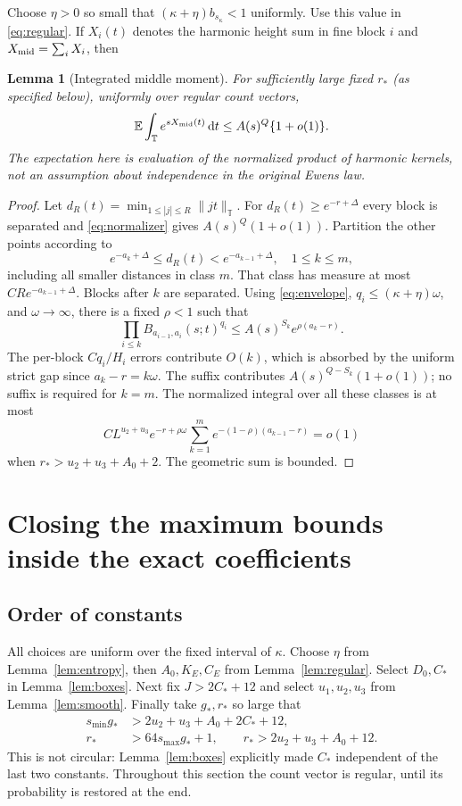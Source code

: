 \documentclass[11pt]{article}
\newtheorem{lemma}[theorem]{Lemma}
\theoremstyle{definition}\newtheorem{definition}[theorem]{Definition}
\theoremstyle{remark}\newtheorem{remark}[theorem]{Remark}
\newcommand{\E}{\mathbb E}\newcommand{\Pp}{\mathbb P}
\newcommand{\T}{\mathbb T}\newcommand{\R}{\mathbb R}\newcommand{\C}{\mathbb C}
\newcommand{\dd}{\,\mathrm d}\newcommand{\ind}{\mathbf1}
\numberwithin{equation}{section}\allowdisplaybreaks
\begin{document}
Choose $\eta>0$ so small that $(\kappa+\eta)b_{s_\kappa}<1$ uniformly.
Use this value in \eqref{eq:regular}. If $X_i(t)$ denotes the harmonic
height sum in fine block $i$ and $X_{\rm mid}=\sum_iX_i$, then
\begin{lemma}[Integrated middle moment]\label{lem:integrated}
For sufficiently large fixed $r_*$ (as specified below), uniformly over
regular count vectors,
\begin{equation}\label{eq:integrated}
 \E\int_\T e^{sX_{\rm mid}(t)}\dd t\le A(s)^Q\{1+o(1)\}.
\end{equation}
The expectation here is evaluation of the normalized product of harmonic
kernels, not an assumption about independence in the original Ewens law.
\end{lemma}
\begin{proof}
Let $d_R(t)=\min_{1\le|j|\le R}\|jt\|_\T$.
For $d_R(t)\ge e^{-r+\Delta}$ every block is separated and
\eqref{eq:normalizer} gives $A(s)^Q(1+o(1))$.
Partition the other points according to
\[
 e^{-a_k+\Delta}\le d_R(t)<e^{-a_{k-1}+\Delta},\quad1\le k\le m,
\]
including all smaller distances in class $m$. That class has measure at
most $CR e^{-a_{k-1}+\Delta}$. Blocks after $k$ are separated.
Using \eqref{eq:envelope}, $q_i\le(\kappa+\eta)\omega$, and
$\omega\to\infty$, there is a fixed $\rho<1$ such that
\[
 \prod_{i\le k}B_{a_{i-1},a_i}(s;t)^{q_i}
 \le A(s)^{S_k}e^{\rho(a_k-r)}.
\]
The per-block $Cq_i/H_i$ errors contribute $O(k)$, which is absorbed
by the uniform strict gap since $a_k-r=k\omega$.
The suffix contributes $A(s)^{Q-S_k}(1+o(1))$; no suffix is required for
$k=m$. The normalized integral over all these classes is at most
\[
 C L^{u_2+u_3}e^{-r+\rho\omega}
 \sum_{k=1}^m e^{-(1-\rho)(a_{k-1}-r)}=o(1)
\]
when $r_*>u_2+u_3+A_0+2$. The geometric sum is bounded.
\end{proof}

\section{Closing the maximum bounds inside the exact coefficients}
\label{sec:maximum}

\subsection{Order of constants}
All choices are uniform over the fixed interval of $\kappa$. Choose
$\eta$ from Lemma~\ref{lem:entropy}, then $A_0,K_E,C_E$ from
Lemma~\ref{lem:regular}. Select $D_0,C_*$ in Lemma~\ref{lem:boxes}.
Next fix $J>2C_*+12$ and select $u_1,u_2,u_3$ from
Lemma~\ref{lem:smooth}. Finally take $g_*,r_*$ so large that
\begin{align}\label{eq:constant-order}
 s_{\min}g_*&>2u_2+u_3+A_0+2C_*+12,\\
 r_*&>64s_{\max}g_*+1,\qquad
 r_*>2u_2+u_3+A_0+12.\nonumber
\end{align}
This is not circular: Lemma~\ref{lem:boxes} explicitly made $C_*$
independent of the last two constants. Throughout this section the count
vector is regular, until its probability is restored at the end.
\end{document}
